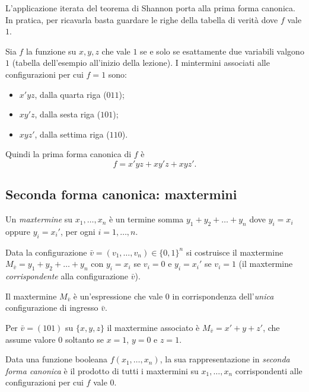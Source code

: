 \documentclass[11pt,a4paper]{article}
\begin{document}
L'applicazione iterata del teorema di Shannon porta alla prima forma canonica.
In pratica, per ricavarla basta guardare le righe della tabella di verità dove
$f$ vale $1$.

\begin{esempio}
Sia $f$ la funzione su $x, y, z$ che vale $1$ se e solo se esattamente due
variabili valgono $1$ (tabella dell'esempio all'inizio della lezione). I mintermini associati alle
configurazioni per cui $f = 1$ sono:
\begin{itemize}
    \item $x'yz$, dalla quarta riga ($011$);
    \item $xy'z$, dalla sesta riga ($101$);
    \item $xyz'$, dalla settima riga ($110$).
\end{itemize}
Quindi la prima forma canonica di $f$ è
\[
  f = x'yz + xy'z + xyz' .
\]
\end{esempio}

\subsection{Seconda forma canonica: maxtermini}

\begin{definizione}[Maxtermine]
Un \emph{maxtermine} su $x_1, \dots, x_n$ è un termine somma
$y_1 + y_2 + \dots + y_n$ dove $y_i = x_i$ oppure $y_i = x_i'$, per ogni
$i = 1, \dots, n$.

Data la configurazione $\bar{v} = (v_1, \dots, v_n) \in \{0,1\}^n$ si costruisce
il maxtermine $M_{\bar{v}} = y_1 + y_2 + \dots + y_n$ con $y_i = x_i$ se
$v_i = 0$ e $y_i = x_i'$ se $v_i = 1$ (il maxtermine \emph{corrispondente} alla
configurazione $\bar{v}$).
\end{definizione}

Il maxtermine $M_{\bar{v}}$ è un'espressione che vale $0$ in corrispondenza
dell'\emph{unica} configurazione di ingresso $\bar{v}$.

\begin{esempio}
Per $\bar{v} = (101)$ su $\{x,y,z\}$ il maxtermine associato è
$M_{\bar{v}} = x' + y + z'$, che assume valore $0$ soltanto se $x = 1$,
$y = 0$ e $z = 1$.
\end{esempio}

\begin{definizione}
Data una funzione booleana $f(x_1, \dots, x_n)$, la sua rappresentazione in
\emph{seconda forma canonica} è il prodotto di tutti i maxtermini su
$x_1, \dots, x_n$ corrispondenti alle configurazioni per cui $f$ vale $0$.
\end{definizione}
\end{document}
